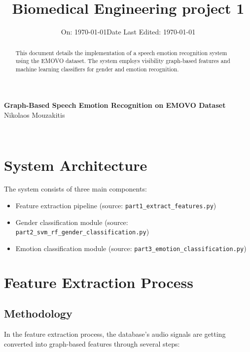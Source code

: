 \documentclass[12pt]{ieeetj}
\title{\LARGE \textbf{Biomedical Engineering project 1}}
\author{}
\date{\large On: \today}
\begin{document}
\onecolumn
\makeatletter
\begin{titlepage}
\centering
\vspace* {1cm}
{ 
{\LARGE \textbf{Graph-Based Speech Emotion Recognition on EMOVO Dataset}}\\[1cm]




	 {Nikolaos Mouzakitis}\\[1cm]
\date{\large Date Last Edited: \today}
	{\@date\\}}
\end{titlepage}
\makeatother

\begin{abstract}
This document details the implementation of a speech emotion recognition system using the EMOVO dataset. 
The system employs
visibility graph-based features and machine learning classifiers for gender and emotion recognition.

\end{abstract}
\section{System Architecture}
The system consists of three main components:
\begin{itemize}
	\item Feature extraction pipeline (source: \texttt{part1\_extract\_features.py})
	\item Gender classification module (source: \texttt{part2\_svm\_rf\_gender\_classification.py})
	\item Emotion classification module (source: \texttt{part3\_emotion\_classification.py})
\end{itemize}

\section{Feature Extraction Process}
\subsection{Methodology}
In the feature extraction process, the database's audio signals are getting converted
into graph-based features through several steps:
\end{document}
